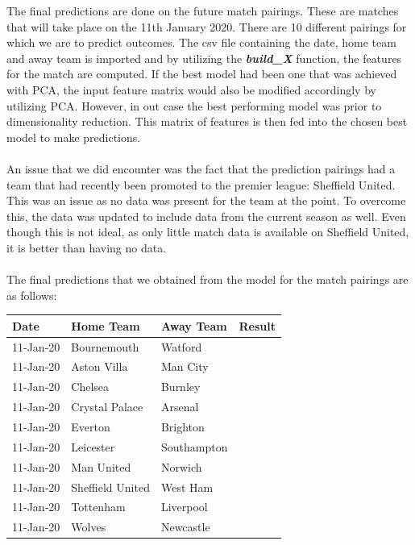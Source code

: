 \documentclass[a4paper,12pt]{article}
\begin{document}
	The final predictions are done on the future match pairings. These are matches that will take place on the 11th January 2020. There are 10 different pairings for which we are to predict outcomes. The csv file containing the date, home team and away team is imported and by utilizing the \textbf{\textit{build\_X}} function, the features for the match are computed. If the best model had been one that was achieved with PCA, the input feature matrix would also be modified accordingly by utilizing PCA. However, in out case the best performing model was prior to dimensionality reduction. This matrix of features is then fed into the chosen best model to make predictions. \\
	\\
	An issue that we did encounter was the fact that the prediction pairings had a team that had recently been promoted to the premier league: Sheffield United. This was an issue as no data was present for the team at the point. To overcome this, the data was updated to include data from the current season as well. Even though this is not ideal, as only little match data is available on Sheffield United, it is better than having no data.\\
	\\
	The final predictions that we obtained from the model for the match pairings are as follows:
	
	\begin{table}[H]
		\centering
		\begin{tabular}{@{}llll@{}}
			\toprule
			Date      & Home Team        & Away Team   & Result \\ \midrule
			11-Jan-20 & Bournemouth      & Watford     &        \\
			11-Jan-20 & Aston Villa      & Man City    &        \\
			11-Jan-20 & Chelsea          & Burnley     &        \\
			11-Jan-20 & Crystal Palace   & Arsenal     &        \\
			11-Jan-20 & Everton          & Brighton    &        \\
			11-Jan-20 & Leicester        & Southampton &        \\ \cmidrule(r){1-3}
			11-Jan-20 & Man United       & Norwich     &        \\
			11-Jan-20 & Sheffield United & West Ham    &        \\
			11-Jan-20 & Tottenham        & Liverpool   &        \\
			11-Jan-20 & Wolves           & Newcastle   &        \\ \bottomrule
		\end{tabular}
	\end{table}
\end{document}
